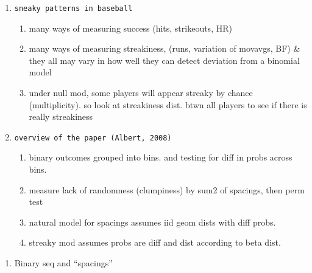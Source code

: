 \documentclass[12pt,twoside]{dukestatscithesis}
\providecommand{\tightlist}{%
  \setlength{\itemsep}{0pt}\setlength{\parskip}{0pt}}
\theoremstyle{definition}
\theoremstyle{definition}
\theoremstyle{definition}
\theoremstyle{remark}
\begin{document}
\begin{enumerate}
\def\labelenumi{\arabic{enumi}.}
\item
\begin{verbatim}
sneaky patterns in baseball
\end{verbatim}
  \begin{enumerate}
  \def\labelenumii{\alph{enumii}.}
  \tightlist
  \item
    many ways of measuring success (hits, strikeouts, HR)\\
  \item
    many ways of measuring streakiness, (runs, variation of movavgs, BF)
    \& they all may vary in how well they can detect deviation from a
    binomial model
  \item
    under null mod, some players will appear streaky by chance
    (multiplicity). so look at streakiness dist. btwn all players to see
    if there is really streakiness
  \end{enumerate}
\item
\begin{verbatim}
overview of the paper (Albert, 2008)
\end{verbatim}
  \begin{enumerate}
  \def\labelenumii{\alph{enumii}.}
  \tightlist
  \item
    binary outcomes grouped into bins. and testing for diff in probs
    across bins.
  \item
    measure lack of randomness (clumpiness) by sum2 of spacings, then
    perm test
  \item
    natural model for spacings assumes iid geom dists with diff probs.
  \item
    streaky mod assumes probs are diff and dist according to beta dist.
  \end{enumerate}
\end{enumerate}
\begin{enumerate}
\def\labelenumi{\Alph{enumi}.}
\setcounter{enumi}{1}
\tightlist
\item
  Binary seq and ``spacings''
\end{enumerate}
\end{document}
